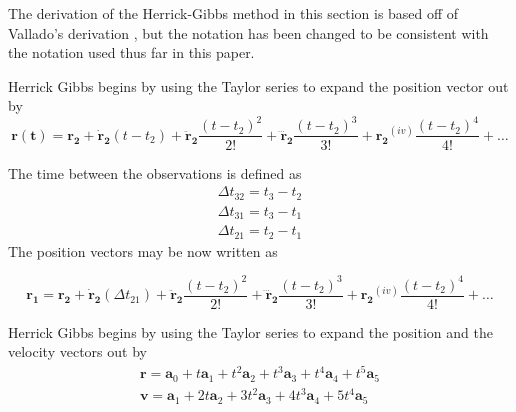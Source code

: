 \documentclass[12pt]{article}
\begin{document}
	\iffalse
	The derivation of the Herrick-Gibbs method in this section is based off of Vallado's derivation \cite{vallado2007fundamentals}, but the notation has been changed to be consistent with the notation used thus far in this paper. 
	
		Herrick Gibbs begins by using the Taylor series to expand the position vector out by 
		\begin{equation}
		\mathbf{r(t)}=\mathbf{r_2}+\mathbf{\dot{r}_2} (t-t_2) + \mathbf{\ddot{r}_2} \frac{(t-t_2)^2}{2!}+ \mathbf{\dddot{r}_2} \frac{(t-t_2)^3}{3!}+ \mathbf{{r_2}}^{(iv)} \frac{(t-t_2)^4}{4!}+\dots
		\end{equation}
		
		The time between the observations is defined as 
		\begin{equation}
		\begin{array} { l } { \Delta t _ { 32 } = t _ { 3 } - t _ { 2 } } \\ { \Delta t _ { 31 } = t _ { 3 } - t _ { 1 } } \\ { \Delta t _ { 21 } = t _ { 2 } - t _ { 1 } } \end{array}
		\end{equation}
		The position vectors may be now written as 
		
		\begin{equation}
		\mathbf{r_1}=\mathbf{r_2}+\mathbf{\dot{r}_2} (\Delta t _ { 21 } ) + \mathbf{\ddot{r}_2} \frac{(t-t_2)^2}{2!}+ \mathbf{\dddot{r}_2} \frac{(t-t_2)^3}{3!}+ \mathbf{{r_2}}^{(iv)} \frac{(t-t_2)^4}{4!}+\dots
		\end{equation}

	
	
	Herrick Gibbs begins by using the Taylor series to expand the position and the velocity vectors out by 
	\begin{equation}
	\begin{array} { l } { \mathbf { r } = \mathbf { a } _ { 0 } + t \mathbf { a } _ { 1 } + t ^ { 2 } \mathbf { a } _ { 2 } + t ^ { 3 } \mathbf { a } _ { 3 } + t ^ { 4 } \mathbf { a } _ { 4 } + t ^ { 5 } \mathbf { a } _ { 5 } } \\ { \mathbf { v } = \mathbf { a } _ { 1 } + 2 t \mathbf { a } _ { 2 } + 3 t ^ { 2 } \mathbf { a } _ { 3 } + 4 t ^ { 3 } \mathbf { a } _ { 4 } + 5 t ^ { 4 } \mathbf { a } _ { 5 } } \end{array}
	\end{equation}
	
	
	
\end{document}
